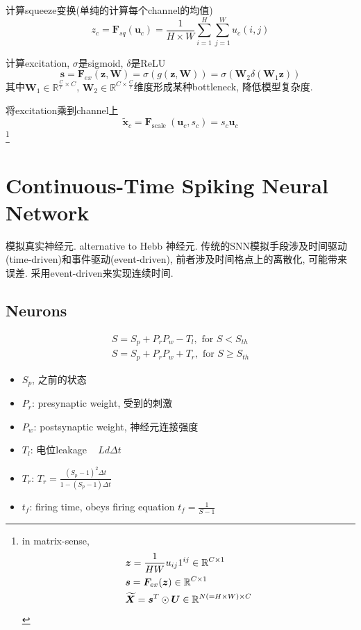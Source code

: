 \documentclass{article}
\begin{document}
计算squeeze变换(单纯的计算每个channel的均值)
\begin{equation}
    z_{c}=\mathbf{F}_{s q}\left(\mathbf{u}_{c}\right)=\frac{1}{H \times W} \sum_{i=1}^{H} \sum_{j=1}^{W} u_{c}(i, j)
\end{equation}

计算excitation, $\sigma$是sigmoid, $\delta$是ReLU
\begin{equation}
    \mathbf{s}=\mathbf{F}_{e x}(\mathbf{z}, \mathbf{W})=\sigma(g(\mathbf{z}, \mathbf{W}))=\sigma\left(\mathbf{W}_{2} \delta\left(\mathbf{W}_{1} \mathbf{z}\right)\right)
\end{equation}
其中$\mathbf{W}_{1} \in \mathbb{R}^{\frac{C}{r} \times C}$,  $\mathbf{W}_{2} \in \mathbb{R}^{C \times \frac{C}{r}}$维度形成某种bottleneck, 降低模型复杂度.

将excitation乘到channel上
\begin{equation}
    \widetilde{\mathbf{x}}_{c}=\mathbf{F}_{\text {scale }}\left(\mathbf{u}_{c}, s_{c}\right)=s_{c} \mathbf{u}_{c}
\end{equation}\footnote{
    in matrix-sense, 
    \begin{align}
        &\boldsymbol{z}=\frac 1 {HW} u_{ij}1^{ij} \in \mathbb{R}^{C\times 1}\\
        &\boldsymbol{s}=\boldsymbol{F}_{ex}(\boldsymbol{z})\in \mathbb{R}^{C\times 1}\\
        &\widetilde{\boldsymbol{X}}=\boldsymbol{s}^T \odot \boldsymbol{U} \in {\mathbb{R}^{N(=H\times W)\times C}}
    \end{align}
}

\section{Continuous-Time Spiking Neural Network}

模拟真实神经元. alternative to Hebb 神经元. 传统的SNN模拟手段涉及时间驱动(time-driven)和事件驱动(event-driven), 前者涉及时间格点上的离散化, 可能带来误差. 采用event-driven来实现连续时间.

\subsection{Neurons}
\begin{equation}
    \begin{array}{l}
    S=S_{p}+P_{r} P_{w}-T_{l}, \text { for } S<S_{t h} \\
    S=S_{p}+P_{r} P_{w}+T_{r}, \text { for } S \geq S_{t h}
    \end{array}
\end{equation}
\begin{itemize}
    \item $S_p$, 之前的状态
    \item $P_r$: presynaptic weight, 受到的刺激
    \item $P_w$: postsynaptic weight, 神经元连接强度
    \item $T_l$: 电位leakage ~ $Ld\Delta t$
    \item $T_r$: $T_{r}=\frac{\left(S_{p}-1\right)^{2} \Delta t}{1-\left(S_{p}-1\right) \Delta t}$
    \item $t_f$: firing time, obeys firing equation $t_f=\frac 1 {S-1}$
\end{itemize}
\end{document}
